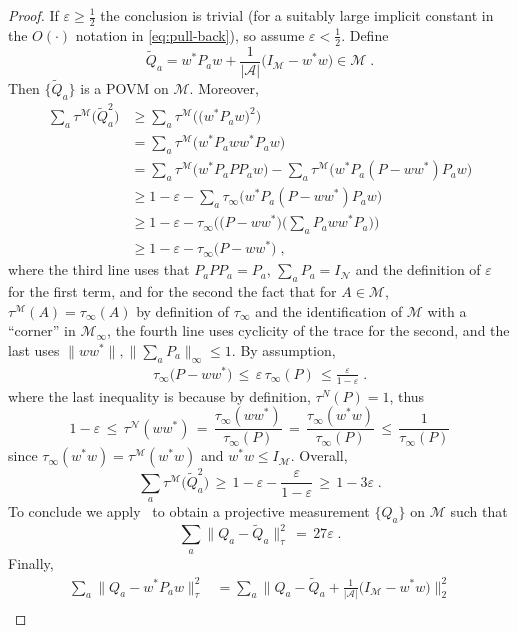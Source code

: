 \documentclass[11pt]{article}
\theoremstyle{definition}
\newcommand{\Id}{\ensuremath{I}}
\newcommand{\mA}{\ensuremath{\mathcal{A}}}
\newcommand{\mM}{\ensuremath{\mathcal{M}}}
\newcommand{\eps}{\varepsilon}
\newcommand{\mN}{\mathcal{N}}
\begin{document}
\begin{proof}
If $\eps\geq \frac{1}{2}$ the conclusion is trivial (for a suitably large implicit constant in the $O(\cdot)$ notation in \eqref{eq:pull-back}), so assume $\eps<\frac{1}{2}$. 
Define 
\[\tilde{Q}_a = w^* P_a w  + \frac{1}{|\mA|}\big(\Id_\mM - w^* w\big) \in \mM\;.\]
Then $\{\tilde{Q}_a\}$ is a POVM on $\mM$. Moreover, 
\begin{align*}
\sum_a \tau^\mM \big( \tilde{Q}_a^2 \big) &\geq \sum_a \tau^\mM \big( \big(w^* P_a w \big)^2 \big) \\
&= \sum_a \tau^\mM \big(  w^* P_a w w^*P_a w \big)\\
&= \sum_a \tau^\mM \big(  w^* P_a  P P_a w \big) - \sum_a \tau^\mM \big( w^* P_a  ( P - w w^*) P_a w \big)\\
&\geq 1 - \eps -  \sum_a \tau_\infty \big( w^* P_a  ( P - w w^*) P_a w \big)\\
&\geq 1 - \eps -  \tau_\infty\Big(\big( P - w w^*\big)\Big(\sum_a  P_a w w^* P_a\Big)\Big)\\ 
&\geq 1- \eps- \tau_\infty\big( P- w w^*\big)\;,
\end{align*}
where the third line uses that $P_aPP_a=P_a$, $\sum_a P_a = \Id_\mN$ and the definition of $\eps$ for the first term, and for the second the fact that for $A\in\mM$, $\tau^\mM(A)=\tau_\infty(A)$ by definition of $\tau_\infty$ and the identification of $\mM$ with a ``corner'' in $\mM_\infty$, the fourth line uses cyclicity of the trace for the second, and the last uses $\|ww^*\|,\|\sum_a P_a\|_\infty\leq 1$. By assumption, 
\begin{align*}
\tau_\infty\big( P- w w^*\big) \,\leq\, \eps\, \tau_\infty(P)\,\leq \frac{\eps}{1-\eps}\;.
\end{align*}
where the last inequality is because by definition, $\tau^N(P)=1$, thus
\[1-\eps \,\leq\, \tau^\mN(ww^*) \,=\, \frac{\tau_\infty(ww^*)}{\tau_\infty(P)}\,=\, \frac{\tau_\infty(w^*w)}{\tau_\infty(P)}  \,\leq\, \frac{1}{\tau_\infty(P)}\]
since $\tau_\infty(w^* w) = \tau^\mM(w^* w)$ and $w^*w\leq I_\mM$. Overall, 
\[ \sum_a \tau^\mM \big( \tilde{Q}_a^2 \big) \,\geq\, 1-\eps-\frac{\eps}{1-\eps}\,\geq\, 1-3\eps\;.\]
To conclude we apply~\cite[Theorem 1.2]{de2021orthogonalization} to obtain a projective measurement $\{Q_a\}$ on $\mM$ such that 
\begin{equation*}
\sum_a \big\|{Q}_a - \tilde{Q}_a \big\|^2_\tau \,=\, 27\eps\;.
\end{equation*}
Finally,
\begin{align*}
\sum_a \big\|{Q}_a - w^*{P}_a w\big\|^2_\tau &= \sum_a \Big\|{Q}_a - \tilde{Q}_a  + \frac{1}{|\mA|}\big(I_\mM - w^* w\big) \Big\|^2_2\\

\end{align*}
\end{proof}
\end{document}
